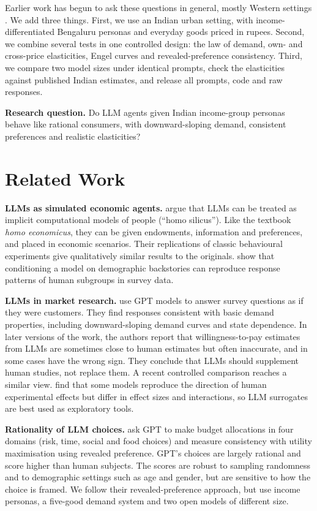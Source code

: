 \documentclass[11pt,a4paper]{article}
\begin{document}
Earlier work has begun to ask these questions in general, mostly Western settings \citep{horton2023,chen2023,brand2023}. We add three things. First, we use an Indian urban setting, with income-differentiated Bengaluru personas and everyday goods priced in rupees. Second, we combine several tests in one controlled design: the law of demand, own- and cross-price elasticities, Engel curves and revealed-preference consistency. Third, we compare two model sizes under identical prompts, check the elasticities against published Indian estimates, and release all prompts, code and raw responses.

\textbf{Research question.} Do LLM agents given Indian income-group personas behave like rational consumers, with downward-sloping demand, consistent preferences and realistic elasticities?

\section{Related Work}
\textbf{LLMs as simulated economic agents.} \citet{horton2023} argue that LLMs can be treated as implicit computational models of people (``homo silicus''). Like the textbook \emph{homo economicus}, they can be given endowments, information and preferences, and placed in economic scenarios. Their replications of classic behavioural experiments give qualitatively similar results to the originals. \citet{argyle2023} show that conditioning a model on demographic backstories can reproduce response patterns of human subgroups in survey data.

\textbf{LLMs in market research.} \citet{brand2023} use GPT models to answer survey questions as if they were customers. They find responses consistent with basic demand properties, including downward-sloping demand curves and state dependence. In later versions of the work, the authors report that willingness-to-pay estimates from LLMs are sometimes close to human estimates but often inaccurate, and in some cases have the wrong sign. They conclude that LLMs should supplement human studies, not replace them. A recent controlled comparison reaches a similar view. \citet{hoq2026} find that some models reproduce the direction of human experimental effects but differ in effect sizes and interactions, so LLM surrogates are best used as exploratory tools.

\textbf{Rationality of LLM choices.} \citet{chen2023} ask GPT to make budget allocations in four domains (risk, time, social and food choices) and measure consistency with utility maximisation using revealed preference. GPT's choices are largely rational and score higher than human subjects. The scores are robust to sampling randomness and to demographic settings such as age and gender, but are sensitive to how the choice is framed. We follow their revealed-preference approach, but use income personas, a five-good demand system and two open models of different size.
\end{document}
